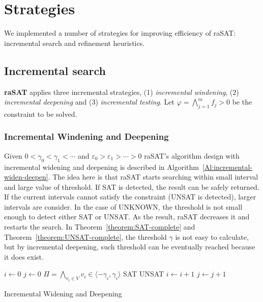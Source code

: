 \chapter{Strategies}
We implemented a number of strategies for improving efficiency of raSAT: incremental search and refinement heuristics.
\section{Incremental search} \label{sec:incsearch}
{\bf raSAT} applies three incremental strategies, 
(1) {\em incremental windening}, (2) {\em incremental deepening} and (3) {\em incremental testing}. 
Let
$\varphi = \bigwedge \limits_{j=1}^m f_j > 0$ be the constraint to be solved.

\subsection{Incremental Windening and Deepening}
Given $0 < \gamma_0 < \gamma_1 < \cdots$ and $\varepsilon_0 > \varepsilon_1 > \cdots > 0$ raSAT's algorithm design with incremental widening and deepening is described in Algorithm~\ref{Al:incremental-widen-deepen}. The idea here is that raSAT starts searching within small interval and large value of threshold. If SAT is detected, the result can be safely returned. If the current intervals cannot satisfy the constraint (UNSAT is detected), larger intervals are consider. In the case of UNKNOWN, the threshold is not small enough to detect either SAT or UNSAT. As the result, raSAT decreases it and restarts the search. In Theorem~\ref{theorem:SAT-complete} and Theorem~\ref{theorem:UNSAT-complete}, the threshold $\gamma$ is not easy to calculate, but by incremental deepening, such threshold can be eventually reached because it does exist.
\begin{algorithm}
\begin{algorithmic}[1]
\State $i\gets 0$
\State $j\gets 0$
	\State $\Pi = \bigwedge\limits_{v_i \in V} v_i \in \langle -\gamma_i, \gamma_i \rangle$ 
		\State \Return SAT
			\State \Return UNSAT
		\Else 
			\State $i \gets i + 1$
		\EndIf
	\Else 
		\State $j \gets j + 1$
	\EndIf
\EndWhile
\end{algorithmic}
\caption{Incremental Widening and Deepening}
\label{Al:incremental-widen-deepen}
\end{algorithm}

